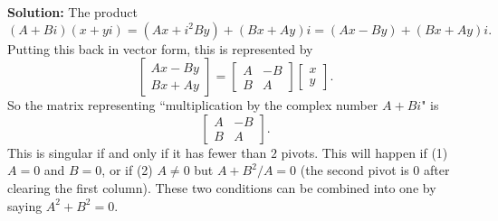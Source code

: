 \documentclass[11pt]{article}
\begin{document}
\begin{enumerate}
\textbf{Solution:}
The product
\[(A + Bi)(x + y i) = (Ax +i^2 By) + (Bx + Ay)i = (Ax - By) + (Bx+Ay)i.\]
Putting this back in vector form, this is represented by
\[\begin{bmatrix} Ax - By \\ Bx + Ay \end{bmatrix} = \begin{bmatrix} A & -B \\ B & A \end{bmatrix} \begin{bmatrix} x \\ y \end{bmatrix}. \]
So the matrix representing ``multiplication by the complex number $A + Bi$" is
\[\begin{bmatrix} A & -B \\ B & A \end{bmatrix}. \]
This is singular if and only if it has fewer than $2$ pivots.  This will happen if (1) $A =0$  and $B = 0$, or if (2) $A \neq 0$ but $A +B^2/A = 0$ (the second pivot is $0$ after clearing the first column).  These two conditions can be combined into one by saying $A^2 + B^2 = 0$.
\end{enumerate}
\end{document}
